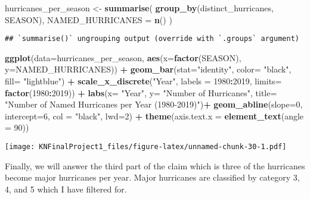 \documentclass[
]{article}
\newenvironment{Shaded}{\begin{snugshade}}{\end{snugshade}}
\newcommand{\DataTypeTok}[1]{\textcolor[rgb]{0.13,0.29,0.53}{#1}}
\newcommand{\DecValTok}[1]{\textcolor[rgb]{0.00,0.00,0.81}{#1}}
\newcommand{\KeywordTok}[1]{\textcolor[rgb]{0.13,0.29,0.53}{\textbf{#1}}}
\newcommand{\NormalTok}[1]{#1}
\newcommand{\OperatorTok}[1]{\textcolor[rgb]{0.81,0.36,0.00}{\textbf{#1}}}
\newcommand{\StringTok}[1]{\textcolor[rgb]{0.31,0.60,0.02}{#1}}
\begin{document}
\begin{Shaded}
\begin{Highlighting}[]
\NormalTok{hurricanes_per_season <-}\StringTok{ }\KeywordTok{summarise}\NormalTok{(}
  \KeywordTok{group_by}\NormalTok{(distinct_hurricanes, SEASON),}
  \DataTypeTok{NAMED_HURRICANES =} \KeywordTok{n}\NormalTok{()}
\NormalTok{)}
\end{Highlighting}
\end{Shaded}

\begin{verbatim}
## `summarise()` ungrouping output (override with `.groups` argument)
\end{verbatim}

\begin{Shaded}
\begin{Highlighting}[]
\KeywordTok{ggplot}\NormalTok{(}\DataTypeTok{data=}\NormalTok{hurricanes_per_season, }\KeywordTok{aes}\NormalTok{(}\DataTypeTok{x=}\KeywordTok{factor}\NormalTok{(SEASON), }\DataTypeTok{y=}\NormalTok{NAMED_HURRICANES)) }\OperatorTok{+}
\KeywordTok{geom_bar}\NormalTok{(}\DataTypeTok{stat=}\StringTok{"identity"}\NormalTok{, }\DataTypeTok{color=} \StringTok{"black"}\NormalTok{, }\DataTypeTok{fill=} \StringTok{"lightblue"}\NormalTok{) }\OperatorTok{+}\StringTok{ }
\StringTok{  }\KeywordTok{scale_x_discrete}\NormalTok{(}\StringTok{"Year"}\NormalTok{, }\DataTypeTok{labels =} \DecValTok{1980}\OperatorTok{:}\DecValTok{2019}\NormalTok{, }\DataTypeTok{limits=} \KeywordTok{factor}\NormalTok{(}\DecValTok{1980}\OperatorTok{:}\DecValTok{2019}\NormalTok{)) }\OperatorTok{+}\StringTok{ }
\StringTok{  }\KeywordTok{labs}\NormalTok{(}\DataTypeTok{x=} \StringTok{"Year"}\NormalTok{, }\DataTypeTok{y=} \StringTok{"Number of Hurricanes"}\NormalTok{, }\DataTypeTok{title=} \StringTok{"Number of Named Hurricanes per Year (1980-2019)"}\NormalTok{)}\OperatorTok{+}\StringTok{  }\KeywordTok{geom_abline}\NormalTok{(}\DataTypeTok{slope=}\DecValTok{0}\NormalTok{, }\DataTypeTok{intercept=}\DecValTok{6}\NormalTok{,  }\DataTypeTok{col =} \StringTok{"black"}\NormalTok{, }\DataTypeTok{lwd=}\DecValTok{2}\NormalTok{) }\OperatorTok{+}
\KeywordTok{theme}\NormalTok{(}\DataTypeTok{axis.text.x =} \KeywordTok{element_text}\NormalTok{(}\DataTypeTok{angle =} \DecValTok{90}\NormalTok{)) }
\end{Highlighting}
\end{Shaded}

\texttt{[image: KNFinalProject1\_files/figure-latex/unnamed-chunk-30-1.pdf]}

Finally, we will answer the third part of the claim which is three of
the hurricanes become major hurricanes per year. Major hurricanes are
classified by category 3, 4, and 5 which I have filtered for.
\end{document}
